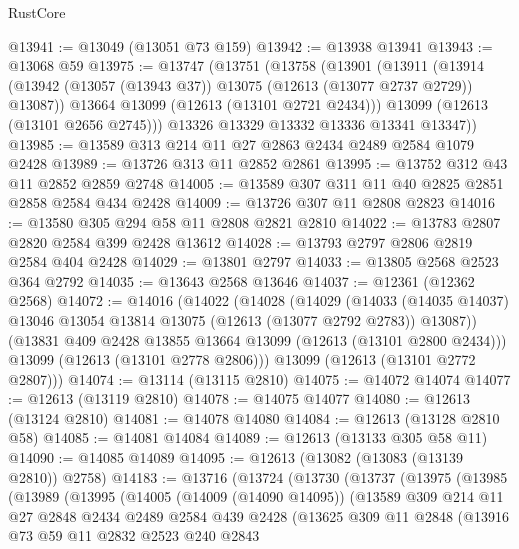 \begin{lexlean}{RustCore}
\begin{coremodule}
@13941 := @13049 (@13051 @73 @159)
@13942 := @13938 @13941
@13943 := @13068 @59
@13975 := @13747
    (@13751
      (@13758
        (@13901
          (@13911
            (@13914 (@13942 (@13057 (@13943 @37)) @13075 (@12613 (@13077 @2737 @2729)) @13087))
            @13664
            @13099
            (@12613 (@13101 @2721 @2434)))
          @13099
          (@12613 (@13101 @2656 @2745)))
        @13326
        @13329
        @13332
        @13336
        @13341
        @13347))
@13985 := @13589 @313 @214 @11 @27 @2863 @2434 @2489 @2584 @1079 @2428
@13989 := @13726 @313 @11 @2852 @2861
@13995 := @13752 @312 @43 @11 @2852 @2859 @2748
@14005 := @13589 @307 @311 @11 @40 @2825 @2851 @2858 @2584 @434 @2428
@14009 := @13726 @307 @11 @2808 @2823
@14016 := @13580 @305 @294 @58 @11 @2808 @2821 @2810
@14022 := @13783 @2807 @2820 @2584 @399 @2428 @13612
@14028 := @13793 @2797 @2806 @2819 @2584 @404 @2428
@14029 := @13801 @2797
@14033 := @13805 @2568 @2523 @364 @2792
@14035 := @13643 @2568 @13646
@14037 := @12361 (@12362 @2568)
@14072 := @14016
    (@14022
      (@14028
        (@14029
          (@14033 (@14035 @14037) @13046 @13054 @13814 @13075 (@12613 (@13077 @2792 @2783)) @13087))
        (@13831 @409 @2428 @13855 @13664 @13099 (@12613 (@13101 @2800 @2434)))
        @13099
        (@12613 (@13101 @2778 @2806)))
      @13099
      (@12613 (@13101 @2772 @2807)))
@14074 := @13114 (@13115 @2810)
@14075 := @14072 @14074
@14077 := @12613 (@13119 @2810)
@14078 := @14075 @14077
@14080 := @12613 (@13124 @2810)
@14081 := @14078 @14080
@14084 := @12613 (@13128 @2810 @58)
@14085 := @14081 @14084
@14089 := @12613 (@13133 @305 @58 @11)
@14090 := @14085 @14089
@14095 := @12613 (@13082 (@13083 (@13139 @2810)) @2758)
@14183 := @13716
    (@13724
      (@13730
        (@13737
          (@13975
            (@13985
              (@13989
                (@13995
                  (@14005
                    (@14009 (@14090 @14095))
                    (@13589
                      @309
                      @214
                      @11
                      @27
                      @2848
                      @2434
                      @2489
                      @2584
                      @439
                      @2428
                      (@13625
                        @309
                        @11
                        @2848
                        (@13916
                          @73
                          @59
                          @11
                          @2832
                          @2523
                          @240
                          @2843

\end{coremodule}
\end{lexlean}
